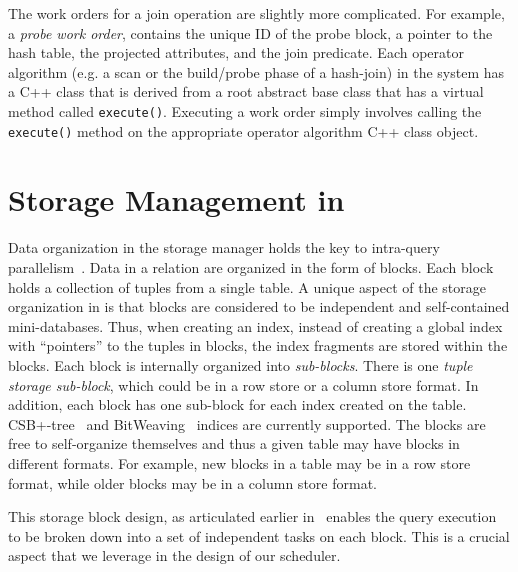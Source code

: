 The work orders for a join operation %
are slightly more complicated. 
For example, a \textit{probe work order},  contains the unique ID of the probe 
block, %
a pointer to the hash table, the projected attributes, and the join predicate.
Each operator algorithm (e.g. a scan or the build/probe phase of a hash-join) 
in the system has a C++ class that is derived from a root abstract base class that has a virtual method called \verb|execute()|.
Executing a work order simply involves calling the \verb|execute()| method 
on the appropriate operator algorithm C++ class object. 

\section{Storage Management in \sys{}}\label{apx:storage-manager}
Data organization in the \sys{} storage manager holds the key to intra-query 
parallelism~\cite{qsstorage}. 
Data in a relation are organized in the form of blocks. 
Each block holds a collection of tuples from a single table. 
A unique aspect of the storage organization in \sys{} is that blocks are considered to 
be independent and self-contained mini-databases. 
Thus, when creating an index, instead of creating a global index with 
``pointers'' to the tuples in blocks, the index fragments are stored within the blocks. 
Each block is internally organized into \textit{sub-blocks}. 
There is one \textit{tuple storage sub-block}, which could be in a row store or a 
column store format.
In addition, each block has one sub-block for each index created on the table. 
CSB+-tree~\cite{csb+-tree} and BitWeaving~\cite{bitweaving} 
indices are currently supported. 
The blocks are free to self-organize themselves and thus a given table may have blocks in different formats. 
For example, new blocks in a table may be in a row store format, while older blocks may 
be in a column store format.

This storage block design, as articulated earlier in~\cite{qsstorage} enables the query execution to be broken down into a set of independent tasks on each block. 
This is a crucial aspect that we leverage in the design of our scheduler. 

